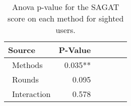 
\begin{table}[!htb]
\centering
\caption{Anova p-value for the SAGAT score on each method for sighted users.}
\label{tab:blocanova_sagat_avg_two_way_sight}
\begin{tabular}{lrrrrr}
\toprule
          Source & P-Value \\
\midrule
    \    Methods & 0.035** \\
     \    Rounds &   0.095 \\
\    Interaction &   0.578 \\
\bottomrule
\end{tabular}
\end{table}

